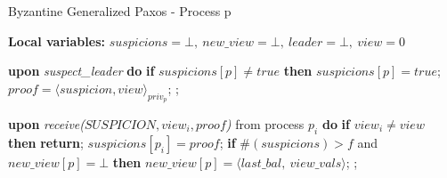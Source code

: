 \begin{algorithm} 
	\caption{Byzantine Generalized Paxos - Process p}
	\label{BFT-Proc}
	\textbf{Local variables:} $suspicions = \bot,\ new\_view = \bot,\ leader = \bot,\ view = 0$
	\begin{algorithmic}[1]
		
		\State \textbf{upon} \textit{suspect\_leader} \textbf{do} 
		\State \hspace{\algorithmicindent} \textbf{if} $suspicions[p] \neq true$ \textbf{then}
		\State\hspace{\algorithmicindent}\hspace{\algorithmicindent} $suspicions[p] = true$;
		\State\hspace{\algorithmicindent}\hspace{\algorithmicindent} $proof = \langle suspicion, view \rangle_{priv_p}$;
		\State\hspace{\algorithmicindent}\hspace{\algorithmicindent} ;	
		\State
		
		\State \textbf{upon} \textit{receive($SUSPICION, view_i, proof$)} from process $p_i$ \textbf{do} 
		\State \hspace{\algorithmicindent} \textbf{if} $view_i \neq view$ \textbf{then}
		\State \hspace{\algorithmicindent}\hspace{\algorithmicindent} \textbf{return};
		\State
		\State \hspace{\algorithmicindent} $suspicions[p_i] = proof$;
		\State \hspace{\algorithmicindent} \textbf{if} $\#(suspicions) > f$ and $new\_view[p] = \bot$ \textbf{then}
		\State\hspace{\algorithmicindent}\hspace{\algorithmicindent} $new\_view[p] = \langle last\_bal,\ view\_vals \rangle$;
		\State\hspace{\algorithmicindent}\hspace{\algorithmicindent} ;
		\State
		

\end{algorithmic}
\end{algorithm}
